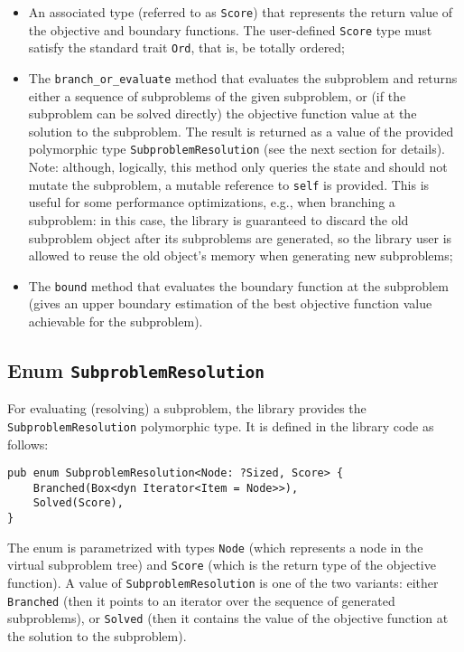 \begin{itemize}
 \item An associated type (referred to as \texttt{Score}) that represents the return value of
    the objective and boundary functions. The user-defined \texttt{Score} type must satisfy
    the standard trait \texttt{Ord}, that is, be totally ordered;

 \item The \texttt{branch\_or\_evaluate} method that evaluates the subproblem and returns
    either a sequence of subproblems of the given subproblem, or (if the subproblem can be
    solved directly) the objective function value at the solution to the subproblem. The result
    is returned as a value of the provided polymorphic type \texttt{SubproblemResolution}
    (see the next section for details). \\
    Note: although, logically, this method only queries the state and should not mutate the
    subproblem, a mutable reference to \texttt{self} is provided. This is useful for some
    performance optimizations, e.g., when branching a subproblem: in this case, the library
    is guaranteed to discard the old subproblem object after its subproblems are generated,
    so the library user is allowed to reuse the old object's memory when generating new
    subproblems;

 \item The \texttt{bound} method that evaluates the boundary function at the subproblem
    (gives an upper boundary estimation of the best objective function value achievable for
    the subproblem).
\end{itemize}

\subsection{Enum \texttt{SubproblemResolution}}

\sloppy
For evaluating (resolving) a subproblem, the library provides the \texttt{SubproblemResolution}
polymorphic type. It is defined in the library code as follows:

\begin{lstlisting}[caption=Enum \texttt{SubproblemResolution},label={lst:SubproblemResolution}]
pub enum SubproblemResolution<Node: ?Sized, Score> {
    Branched(Box<dyn Iterator<Item = Node>>),
    Solved(Score),
}
\end{lstlisting}

The enum is parametrized with types \texttt{Node} (which represents a node in the virtual
subproblem tree) and \texttt{Score} (which is the return type of the objective function).
A value of \texttt{SubproblemResolution} is one of the two variants: either \texttt{Branched}
(then it points to an iterator over the sequence of generated subproblems), or \texttt{Solved}
(then it contains the value of the objective function at the solution to the subproblem).

